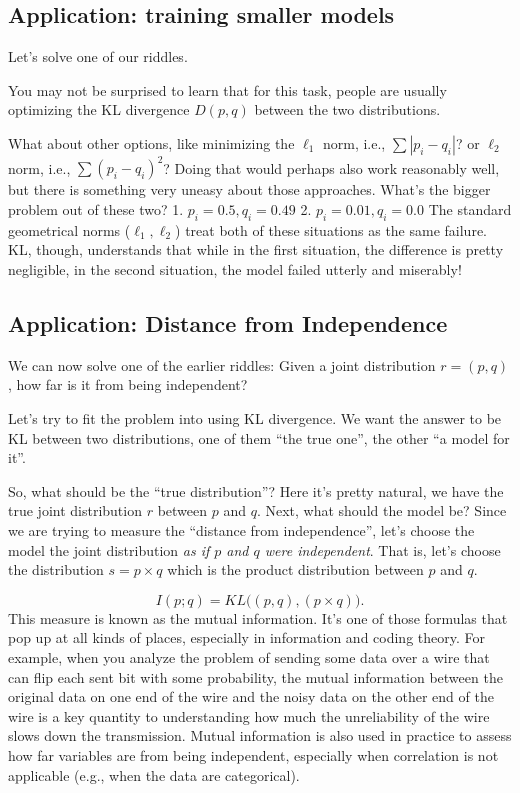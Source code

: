 \documentclass{article}
\begin{document}
\subsection{Application: training smaller models }

Let's solve one of our riddles. 

You may not be surprised to learn that for this task, people are usually optimizing the KL divergence $D(p,q)$ between the two distributions. 

What about other options, like minimizing the $\ell_1$ norm, i.e., $\sum |p_i - q_i|$? or $\ell_2$ norm, i.e., $\sum (p_i - q_i)^2$? Doing that would perhaps also work reasonably well, but there is something very uneasy about those approaches. What's the bigger problem out of these two? 
1. $p_i = 0.5, q_i = 0.49$
2. $p_i = 0.01, q_i = 0.0$
The standard geometrical norms ($\ell_1, \ell_2$) treat both of these situations as the same failure. KL, though, understands that while in the first situation, the difference is pretty negligible, in the second situation, the model failed utterly and miserably!


\subsection{Application: Distance from Independence}

We can now solve one of the earlier riddles: Given a joint distribution $r = (p,q)$, how far is it from being independent? 

Let's try to fit the problem into using KL divergence. We want the answer to be KL between two distributions, one of them ``the true one'', the other ``a model for it''. 

So, what should be the ``true distribution''? Here it's pretty natural, we have the true joint distribution $r$ between $p$ and $q$. Next, what should the model be? Since we are trying to measure the ``distance from independence'', let's choose the model the joint distribution \emph{as if $p$ and $q$ were independent}. That is, let's choose the distribution $s = p \times q$ which is the product distribution between $p$ and $q$. 

\[
I(p;q) = KL\bigl((p,q), (p\times q)\bigr).
\]
This measure is known as the mutual information. It's one of those formulas that pop up at all kinds of places, especially in information and coding theory. For example, when you analyze the problem of sending some data over a wire that can flip each sent bit with some probability, the mutual information between the original data on one end of the wire and the noisy data on the other end of the wire is a key quantity to understanding how much the unreliability of the wire slows down the transmission. Mutual information is also used in practice to assess how far variables are from being independent, especially when correlation is not applicable (e.g., when the data are categorical).
\end{document}
